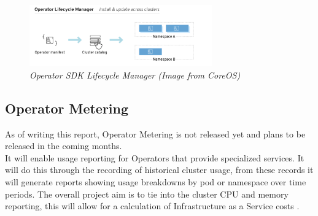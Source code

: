 \begin{figure}[!ht]
\centering
\includegraphics*[width=0.7\textwidth]{images/op21.png}
\caption{\em Operator SDK Lifecycle Manager (Image from CoreOS)}
\label{img:op_lifecycle}
\end{figure}

\subsection{Operator Metering}
As of writing this report, Operator Metering is not released yet and plans to be released in the coming months.\\ It will enable usage reporting for Operators that provide specialized services. It will do this through the recording of historical cluster usage, from these records it will generate reports showing usage breakdowns by pod or namespace over time periods. The overall project aim is to tie into the cluster CPU and memory reporting, this will allow for a calculation of Infrastructure as a Service costs \citep{operator-metering_2018}.